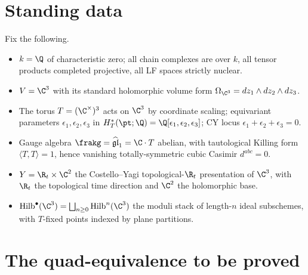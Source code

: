 \section*{Standing data}

Fix the following.
\begin{itemize}
\item $k = \Q$ of characteristic zero; all chain complexes are over
$k$, all tensor products completed projective, all LF spaces strictly
nuclear.
\item $V = \C^3$ with its standard holomorphic volume form
$\Omega_{\C^3} = dz_1\wedge dz_2\wedge dz_3$.
\item The torus $T = (\C^\times)^3$ acts on $\C^3$ by coordinate
scaling; equivariant parameters $\epsilon_1, \epsilon_2, \epsilon_3$
in $H^*_T(\pt;\Q) = \Q[\epsilon_1,\epsilon_2,\epsilon_3]$; CY locus
$\epsilon_1+\epsilon_2+\epsilon_3 = 0$.
\item Gauge algebra $\frakg = \ghat = \C\cdot T$ abelian, with
tautological Killing form $\langle T,T\rangle = 1$, hence vanishing
totally-symmetric cubic Casimir $d^{abc} = 0$.
\item $Y = \R_t\times\C^2$ the Costello--Yagi topological-$\R_t$
presentation of $\C^3$, with $\R_t$ the topological time direction and
$\C^2$ the holomorphic base.
\item $\Hilb^\bullet(\C^3) = \bigsqcup_{n\ge 0}\Hilb^n(\C^3)$ the
moduli stack of length-$n$ ideal subschemes, with $T$-fixed points
indexed by plane partitions.
\end{itemize}

\section*{The quad-equivalence to be proved}

